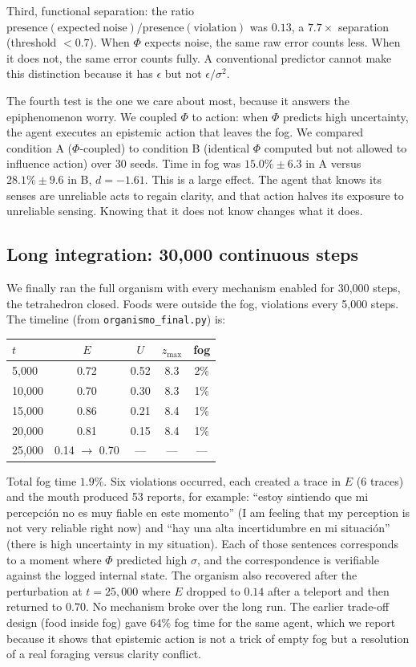 \documentclass[11pt,a4paper]{article}
\begin{document}
Third, functional separation: the ratio $\mathrm{presence}(\mathrm{expected\ noise})/\mathrm{presence}(\mathrm{violation})$ was $0.13$, a $7.7\times$ separation (threshold $<0.7$). When $\Phi$ expects noise, the same raw error counts less. When it does not, the same error counts fully. A conventional predictor cannot make this distinction because it has $\epsilon$ but not $\epsilon/\sigma^2$.

The fourth test is the one we care about most, because it answers the epiphenomenon worry. We coupled $\Phi$ to action: when $\Phi$ predicts high uncertainty, the agent executes an epistemic action that leaves the fog. We compared condition A ($\Phi$-coupled) to condition B (identical $\Phi$ computed but not allowed to influence action) over 30 seeds. Time in fog was $15.0\% \pm 6.3$ in A versus $28.1\% \pm 9.6$ in B, $d=-1.61$. This is a large effect. The agent that knows its senses are unreliable acts to regain clarity, and that action halves its exposure to unreliable sensing. Knowing that it does not know changes what it does.

\subsection{Long integration: 30,000 continuous steps}

We finally ran the full organism with every mechanism enabled for 30,000 steps, the tetrahedron closed. Foods were outside the fog, violations every 5,000 steps. The timeline (from \texttt{organismo\_final.py}) is:

\begin{center}
\begin{tabular}{lcccc}
\toprule
$t$ & $E$ & $U$ & $z_{\max}$ & fog \\
\midrule
5,000 & 0.72 & 0.52 & 8.3 & 2\% \\
10,000 & 0.70 & 0.30 & 8.3 & 1\% \\
15,000 & 0.86 & 0.21 & 8.4 & 1\% \\
20,000 & 0.81 & 0.15 & 8.4 & 1\% \\
25,000 & 0.14 $\rightarrow$ 0.70 & --- & --- & --- \\
\bottomrule
\end{tabular}
\end{center}

Total fog time $1.9\%$. Six violations occurred, each created a trace in $E$ (6 traces) and the mouth produced 53 reports, for example: ``estoy sintiendo que mi percepci\'on no es muy fiable en este momento'' (I am feeling that my perception is not very reliable right now) and ``hay una alta incertidumbre en mi situaci\'on'' (there is high uncertainty in my situation). Each of those sentences corresponds to a moment where $\Phi$ predicted high $\sigma$, and the correspondence is verifiable against the logged internal state. The organism also recovered after the perturbation at $t=25{,}000$ where $E$ dropped to $0.14$ after a teleport and then returned to $0.70$. No mechanism broke over the long run. The earlier trade-off design (food inside fog) gave $64\%$ fog time for the same agent, which we report because it shows that epistemic action is not a trick of empty fog but a resolution of a real foraging versus clarity conflict.
\end{document}
